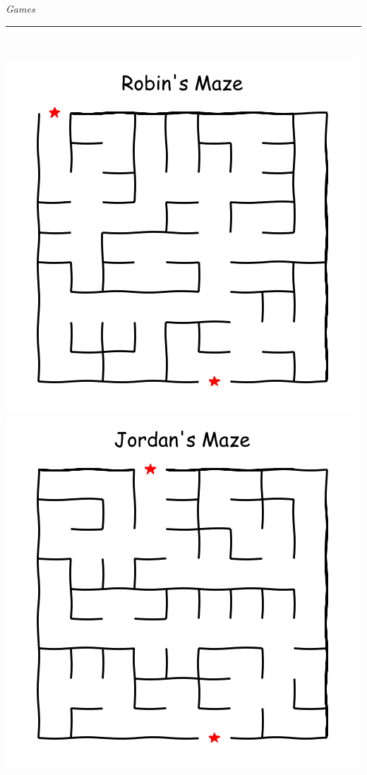 \documentclass[landscape]{article}
\renewcommand\headline[1]{\begin{center} {\huge \textsl{ #1}}\\ %
			\rule[5pt]{0.8\hsize}{0.5pt}\\ \end{center}}
\begin{document}
\begin{multicols}{3}
\headline{Games}
\vspace{-1cm}
\center\includegraphics[width=0.49\linewidth]{images/maze_r.png}\includegraphics[width=0.49\linewidth]{images/maze_j.png}

\renewcommand*\sudokuformat[1]{\sffamily#1}
\setlength\sudokusize{4cm}
\setlength\sudokuthickline{1pt}
\begin{center}
	
\end{center}

\end{multicols}
\end{document}
